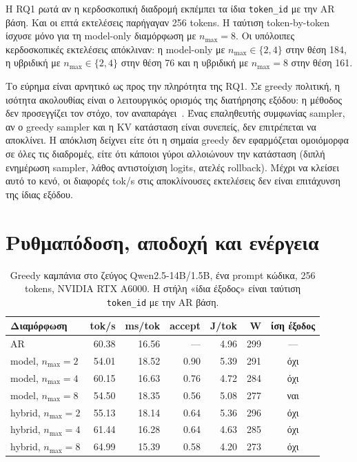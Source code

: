 \documentclass[a4paper,12pt]{report}
\theoremstyle{plain}
\theoremstyle{definition}
\theoremstyle{remark}
\begin{document}
Η RQ1 ρωτά αν η κερδοσκοπική διαδρομή εκπέμπει τα ίδια \texttt{token\_id} με
την AR βάση. Και οι επτά εκτελέσεις παρήγαγαν 256 tokens. Η ταύτιση
token-by-token ίσχυσε μόνο για τη model-only διαμόρφωση με \(n_{\max}=8\).
Οι υπόλοιπες κερδοσκοπικές εκτελέσεις απόκλιναν: η model-only με
\(n_{\max}\in\{2,4\}\) στην θέση 184, η υβριδική με \(n_{\max}\in\{2,4\}\)
στην θέση 76 και η υβριδική με \(n_{\max}=8\) στην θέση 161.

Το εύρημα είναι αρνητικό ως προς την πληρότητα της RQ1. Σε greedy πολιτική, η
ισότητα ακολουθίας είναι ο λειτουργικός ορισμός της διατήρησης εξόδου: η μέθοδος
δεν προσεγγίζει τον στόχο, τον
αναπαράγει~\cite{vllm-speculators-docs,vllm-speculative-docs}.
Ένας επαληθευτής συμφωνίας sampler, αν ο greedy sampler και η KV κατάσταση
είναι συνεπείς, δεν επιτρέπεται να αποκλίνει. Η απόκλιση δείχνει είτε ότι η
σημαία greedy δεν εφαρμόζεται ομοιόμορφα σε όλες τις διαδρομές, είτε ότι
κάποιοι γύροι αλλοιώνουν την κατάσταση (διπλή ενημέρωση sampler, λάθος
αντιστοίχιση logits, ατελές rollback). Μέχρι να κλείσει αυτό το κενό, οι
διαφορές tok/s στις αποκλίνουσες εκτελέσεις δεν είναι επιτάχυνση της ίδιας
εξόδου.

\section{Ρυθμαπόδοση, αποδοχή και ενέργεια}
\label{sec:throughput}

\begin{table}[ht]
  \centering
  \caption{Greedy καμπάνια στο ζεύγος Qwen2.5-14B/1.5B, ένα prompt κώδικα, 256
    tokens, NVIDIA RTX A6000. Η στήλη «ίδια έξοδος» είναι ταύτιση
  \texttt{token\_id} με την AR βάση.}
  \label{tab:campaign}
  \small
  \setlength{\tabcolsep}{4pt}
  \begin{tabular}{@{}l r r r r r c@{}}
    \toprule
    Διαμόρφωση             & tok/s & ms/tok & accept & J/tok & W   &
    ίση έξοδος \\
    \midrule
    AR                     & 60.38 & 16.56  & ---    & 4.96  & 299 &
    ---        \\
    model, \(n_{\max}=2\)  & 54.01 & 18.52  & 0.90   & 5.39  & 291 &
    όχι        \\
    model, \(n_{\max}=4\)  & 60.15 & 16.63  & 0.76   & 4.72  & 284 &
    όχι        \\
    model, \(n_{\max}=8\)  & 54.50 & 18.35  & 0.56   & 5.08  & 277 &
    ναι        \\
    hybrid, \(n_{\max}=2\) & 55.13 & 18.14  & 0.64   & 5.36  & 296 &
    όχι        \\
    hybrid, \(n_{\max}=4\) & 61.44 & 16.28  & 0.64   & 4.63  & 285 &
    όχι        \\
    hybrid, \(n_{\max}=8\) & 64.99 & 15.39  & 0.58   & 4.20  & 273 &
    όχι        \\
    \bottomrule
  \end{tabular}
\end{table}
\end{document}
